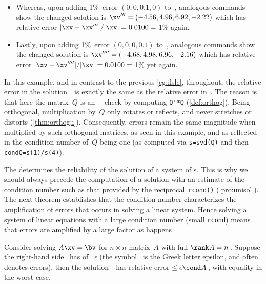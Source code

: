 \begin{example}
\begin{solution}
\begin{itemize}
\item Whereas, upon adding 1\%~error \((0,0,0.1,0)\) to~\bv, analogous commands show the changed solution is \(\xv'''=(-4.56,4.96,6.92,-2.22)\) which has relative error \(|\xv-\xv'''|/|\xv|=0.0100={}\)1\% again.

\item Lastly, upon adding 1\%~error \((0,0,0,0.1)\) to~\bv, analogous commands show the changed solution is \(\xv''''=(-4.68,4.98,6.96,-2.16)\) which has relative error \(|\xv-\xv''''|/|\xv|=0.0100={}\)1\% yet again.

\end{itemize}
In this example, and in contrast to the previous \cref{eg:ilsle}, throughout, the relative error in the solution~\xv\ is exactly the same as the relative error in~\bv.
The reason is that here the matrix~\(Q\) is an ---check by computing \verb|Q'*Q| (\cref{def:orthog}).
Being orthogonal, multiplication by~\(Q\) only rotates or reflects, and never stretches or distorts (\cref{thm:orthog:i}).
Consequently, errors remain the same magnitude when multiplied by such orthogonal matrices, as seen in this example, and as reflected in the condition number of~\(Q\) being one (as computed via \verb|s=svd(Q)| and then \verb|condQ=s(1)/s(4)|).
\end{solution}
\end{example}





The  determines the reliability of the solution of a system of s.
This is why we should always precede the computation of a solution with an estimate of the condition number such as that provided by the reciprocal~\verb|rcond()| (\cref{pro:unisol}). 
The next theorem establishes that the condition number characterizes the amplification of errors that occurs in solving a linear system.
Hence solving a system of linear equations with a large condition number (small \verb|rcond|) means that errors are amplified by a large factor as happens 

\begin{theorem} \label{thm:erramp}
Consider solving \(A\xv=\bv\) for \(n\times n\) matrix~\(A\) with full \(\rank A=n\)\,.  
Suppose the right-hand side \bv~has  of ~\(\epsilon\) (the symbol~\idx{$\epsilon$} is the Greek letter epsilon, and often denotes errors),
then the solution~\xv\ has relative error\({}\leq\epsilon\cond A\)\,, with equality in the worst case.
\end{theorem}

